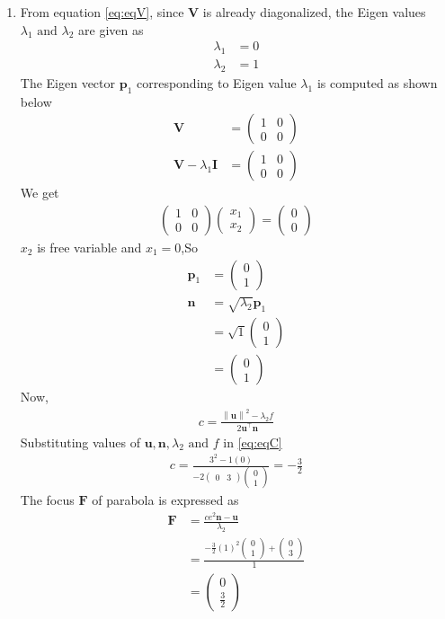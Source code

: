 \documentclass[12pt]{article}
\providecommand{\brak}[1]{\ensuremath{\left(#1\right)}}
\providecommand{\norm}[1]{\left\lVert#1\right\rVert}
\newcommand{\myvec}[1]{\ensuremath{\begin{pmatrix}#1\end{pmatrix}}}
\let\vec\mathbf
\begin{document}
\begin{enumerate}
\item From equation \eqref{eq:eqV}, since $\vec{V}$ is already diagonalized, the Eigen values $\lambda_1 \text{ and } \lambda_2$ are given as
\begin{align}
	\label{eq:eqEigen1}
	\lambda_1 &= 0\\
	\label{eq:eqEigen2}
	\lambda_2 &= 1
\end{align}
The Eigen vector $\vec{p}_1$ corresponding to Eigen value $\lambda_1$ is computed as shown below
\begin{align}
	\vec{V} &= \myvec{1&0\\0&0}\\
	\label{eq:eqLambda1}
	\vec{V} - \lambda_1 \vec{I} &= \myvec{1&0\\0&0}
\end{align}
We get
\begin{align}
	\myvec{1&0\\0&0}\myvec{x_1\\x_2} = \myvec{0\\0}
\end{align}
$x_2$ is free variable and $x_1 = 0$,So
\begin{align}
	\vec{p}_1 &= \myvec{0\\1}\\
	\vec{n} &= \sqrt{\lambda_2}\vec{p}_1\\
		&= \sqrt{1}\myvec{0\\1}\\
		&= \myvec{0\\1}
\end{align}
Now,
\begin{align}
	\label{eq:eqC}
	c = \frac{\norm{\vec{u}}^2 - \lambda_2 f}{2\vec{u}^\top \vec{n}}
\end{align}
Substituting values of $\vec{u},\vec{n},\lambda_2 \text{ and } f$ in \eqref{eq:eqC}
\begin{align}
	c = \frac{3^2-1\brak{0}}{-2\myvec{0&3}\myvec{0\\1}} = -\frac{3}{2}
\end{align}
The focus $\vec{F}$ of parabola is expressed as
\begin{align}
	\vec{F} &= \frac{ce^2 \vec{n}-\vec{u}}{\lambda_2}\\
		&= \frac{-\frac{3}{2}\brak{1}^2 \myvec{0\\1}+\myvec{0\\3}}{1}\\
		&= \myvec{0\\\frac{3}{2}}

\end{align}
\end{enumerate}
\end{document}
